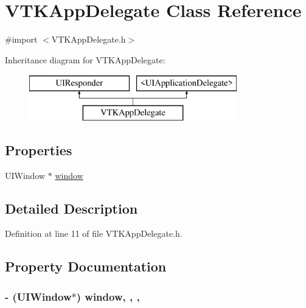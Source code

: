 \hypertarget{interface_v_t_k_app_delegate}{\section{V\+T\+K\+App\+Delegate Class Reference}
\label{interface_v_t_k_app_delegate}
}


{\ttfamily \#import $<$V\+T\+K\+App\+Delegate.\+h$>$}

Inheritance diagram for V\+T\+K\+App\+Delegate\+:\begin{figure}[H]
\begin{center}
\leavevmode
\includegraphics[height=2.000000cm]{interface_v_t_k_app_delegate}
\end{center}
\end{figure}
\subsection*{Properties}
\begin{DoxyCompactItemize}
\item 
U\+I\+Window $\ast$ \hyperlink{interface_v_t_k_app_delegate_a3c0e963db66c6210fda40875bb923e57}{window}
\end{DoxyCompactItemize}


\subsection{Detailed Description}


Definition at line 11 of file V\+T\+K\+App\+Delegate.\+h.



\subsection{Property Documentation}
\hypertarget{interface_v_t_k_app_delegate_a3c0e963db66c6210fda40875bb923e57}{
\subsubsection[{window}]{\setlength{\rightskip}{0pt plus 5cm}-\/ (U\+I\+Window$\ast$) window\hspace{0.3cm}{\ttfamily [read]}, {\ttfamily [write]}, {\ttfamily [nonatomic]}, {\ttfamily [strong]}}}\label{interface_v_t_k_app_delegate_a3c0e963db66c6210fda40875bb923e57}


